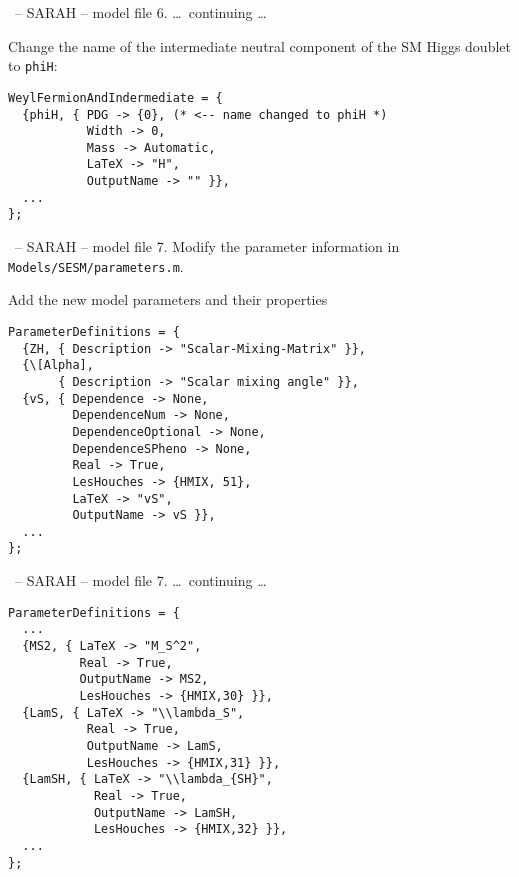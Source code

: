\documentclass[11pt]{beamer}
\begin{document}

\begin{frame}[fragile]{\insertsection\ -- SARAH -- model file}
  6. \ldots\ continuing \ldots

  \bigskip

  Change the name of the intermediate neutral component of the SM
  Higgs doublet to \texttt{phiH}:
  \begin{lstlisting}
WeylFermionAndIndermediate = {
  {phiH, { PDG -> {0}, (* <-- name changed to phiH *)
           Width -> 0,
           Mass -> Automatic,
           LaTeX -> "H",
           OutputName -> "" }},
  ...
};\end{lstlisting}
\end{frame}


\begin{frame}[fragile]{\insertsection\ -- SARAH -- model file}
  7. Modify the parameter information in
  \texttt{Models/SESM/parameters.m}.

  \bigskip

  Add the new model parameters and their properties
  \begin{lstlisting}
ParameterDefinitions = {
  {ZH, { Description -> "Scalar-Mixing-Matrix" }},
  {\[Alpha],
       { Description -> "Scalar mixing angle" }},
  {vS, { Dependence -> None,
         DependenceNum -> None,
         DependenceOptional -> None,
         DependenceSPheno -> None,
         Real -> True,
         LesHouches -> {HMIX, 51},
         LaTeX -> "vS",
         OutputName -> vS }},
  ...
};\end{lstlisting}
\end{frame}


\begin{frame}[fragile]{\insertsection\ -- SARAH -- model file}
  7. \ldots\ continuing \ldots
  \begin{lstlisting}
ParameterDefinitions = {
  ...
  {MS2, { LaTeX -> "M_S^2",
          Real -> True,
          OutputName -> MS2,
          LesHouches -> {HMIX,30} }},
  {LamS, { LaTeX -> "\\lambda_S",
           Real -> True,
           OutputName -> LamS,
           LesHouches -> {HMIX,31} }},
  {LamSH, { LaTeX -> "\\lambda_{SH}",
            Real -> True,
            OutputName -> LamSH,
            LesHouches -> {HMIX,32} }},
  ...
};\end{lstlisting}
\end{frame}
\end{document}
